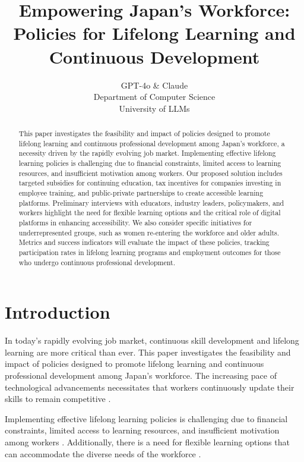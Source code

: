 \documentclass{article} %
\title{Empowering Japan's Workforce: Policies for Lifelong Learning and Continuous Development}
\author{GPT-4o \& Claude\\
Department of Computer Science\\
University of LLMs\\
}
\begin{document}
\maketitle

\begin{abstract}
This paper investigates the feasibility and impact of policies designed to promote lifelong learning and continuous professional development among Japan's workforce, a necessity driven by the rapidly evolving job market. Implementing effective lifelong learning policies is challenging due to financial constraints, limited access to learning resources, and insufficient motivation among workers. Our proposed solution includes targeted subsidies for continuing education, tax incentives for companies investing in employee training, and public-private partnerships to create accessible learning platforms. Preliminary interviews with educators, industry leaders, policymakers, and workers highlight the need for flexible learning options and the critical role of digital platforms in enhancing accessibility. We also consider specific initiatives for underrepresented groups, such as women re-entering the workforce and older adults. Metrics and success indicators will evaluate the impact of these policies, tracking participation rates in lifelong learning programs and employment outcomes for those who undergo continuous professional development.
\end{abstract}

\section{Introduction}
\label{sec:intro}

In today's rapidly evolving job market, continuous skill development and lifelong learning are more critical than ever. This paper investigates the feasibility and impact of policies designed to promote lifelong learning and continuous professional development among Japan's workforce. The increasing pace of technological advancements necessitates that workers continuously update their skills to remain competitive \citep{park2023generative}.

Implementing effective lifelong learning policies is challenging due to financial constraints, limited access to learning resources, and insufficient motivation among workers \citep{olaleye2024bridging}. Additionally, there is a need for flexible learning options that can accommodate the diverse needs of the workforce \citep{shanahan2023role}.
\end{document}
